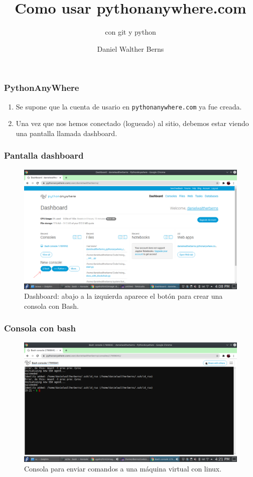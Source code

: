 \documentclass[11pt]{beamer}
\begin{document}
	\author{Daniel Walther Berns}
	\title{Como usar pythonanywhere.com}
	\subtitle{con git y python}
	\date{}
	\begin{frame}[plain]
		\maketitle
	\end{frame}
	
	\begin{frame}[fragile]
		\frametitle{PythonAnyWhere}
		
		\begin{enumerate}
		\item Se supone que la cuenta de usario en \verb-pythonanywhere.com- ya fue creada.
		
		\item Una vez que nos hemos conectado (logueado) al sitio, debemos estar viendo una pantalla llamada dashboard.
		
		\end{enumerate}
	\end{frame}

\begin{frame}
	\frametitle{Pantalla dashboard}
\begin{figure}
	\centering
	\includegraphics[width=0.7\linewidth]{sc/dashboard.png}
	\caption{Dashboard: abajo a la izquierda aparece el botón para crear una consola con Bash.}
	\label{fig:dashboard}
\end{figure}
\end{frame}

\begin{frame}[fragile]
	\frametitle{Consola con bash}
\begin{figure}
	\centering
	\includegraphics[width=0.7\linewidth]{sc/bash.png}
	\caption{Consola para enviar comandos a una máquina virtual con linux.}
	\label{fig:bash}
\end{figure}

\end{frame}
\end{document}
